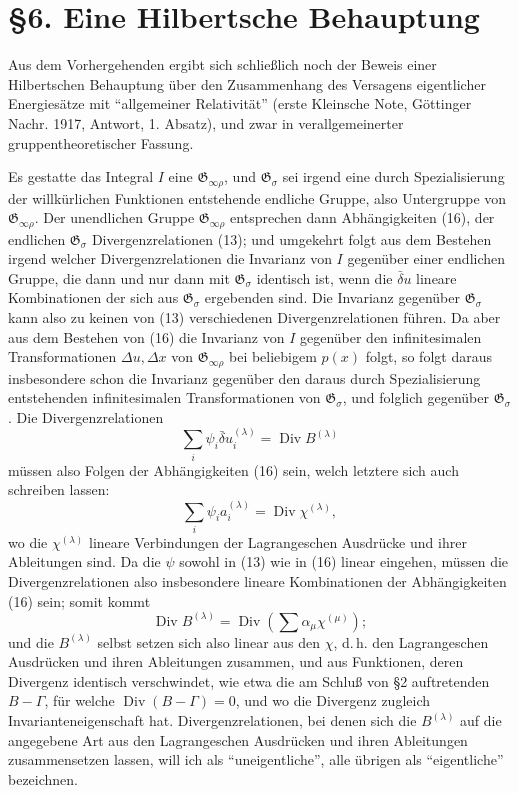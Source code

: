 \documentclass[11pt]{article}
\newcommand{\Div}{\operatorname{Div}}
\newcommand{\G}{\mathfrak G}
\newcommand{\D}{\Delta}
\newcommand{\bd}{\bar{\delta}}
\begin{document}
\section*{\S{}6. Eine Hilbertsche Behauptung}

Aus dem Vorhergehenden ergibt sich schließlich noch der Beweis einer Hilbertschen Behauptung über den Zusammenhang des Versagens eigentlicher Energiesätze mit ``allgemeiner Relativität'' (erste Kleinsche Note, Göttinger Nachr. 1917, Antwort, 1. Absatz), und zwar in verallgemeinerter gruppentheoretischer Fassung.

Es gestatte das Integral \(I\) eine \(\G_{\infty\rho}\), und \(\G_\sigma\) sei irgend eine durch Spezialisierung der willkürlichen Funktionen entstehende endliche Gruppe, also Untergruppe von \(\G_{\infty\rho}\). Der unendlichen Gruppe \(\G_{\infty\rho}\) entsprechen dann Abhängigkeiten (16), der endlichen \(\G_\sigma\) Divergenzrelationen (13); und umgekehrt folgt aus dem Bestehen irgend welcher Divergenzrelationen die Invarianz von \(I\) gegenüber einer endlichen Gruppe, die dann und nur dann mit \(\G_\sigma\) identisch ist, wenn die \(\bd u\) lineare Kombinationen der sich aus \(\G_\sigma\) ergebenden sind. Die Invarianz gegenüber \(\G_\sigma\) kann also zu keinen von (13) verschiedenen Divergenzrelationen führen. Da aber aus dem Bestehen von (16) die Invarianz von \(I\) gegenüber den infinitesimalen Transformationen \(\D u,\D x\) von \(\G_{\infty\rho}\) bei beliebigem \(p(x)\) folgt, so folgt daraus insbesondere schon die Invarianz gegenüber den daraus durch Spezialisierung entstehenden infinitesimalen Transformationen von \(\G_\sigma\), und folglich gegenüber \(\G_\sigma\). Die Divergenzrelationen
\[
\sum_i\psi_i\bd u_i^{(\lambda)}=\Div B^{(\lambda)}
\]
müssen also Folgen der Abhängigkeiten (16) sein, welch letztere sich auch schreiben lassen:
\[
\sum_i\psi_i a_i^{(\lambda)}=\Div\chi^{(\lambda)},
\]
wo die \(\chi^{(\lambda)}\) lineare Verbindungen der Lagrangeschen Ausdrücke und ihrer Ableitungen sind. Da die \(\psi\) sowohl in (13) wie in (16) linear eingehen, müssen die Divergenzrelationen also insbesondere lineare Kombinationen der Abhängigkeiten (16) sein; somit kommt
\[
\Div B^{(\lambda)}=\Div\left(\sum \alpha_\mu\chi^{(\mu)}\right);
\]
und die \(B^{(\lambda)}\) selbst setzen sich also linear aus den \(\chi\), d.\,h. den Lagrangeschen Ausdrücken und ihren Ableitungen zusammen, und aus Funktionen, deren Divergenz identisch verschwindet, wie etwa die am Schluß von \S{}2 auftretenden \(B-\Gamma\), für welche \(\Div(B-\Gamma)=0\), und wo die Divergenz zugleich Invarianteneigenschaft hat. Divergenzrelationen, bei denen sich die \(B^{(\lambda)}\) auf die angegebene Art aus den Lagrangeschen Ausdrücken und ihren Ableitungen zusammensetzen lassen, will ich als ``uneigentliche'', alle übrigen als ``eigentliche'' bezeichnen.
\end{document}
